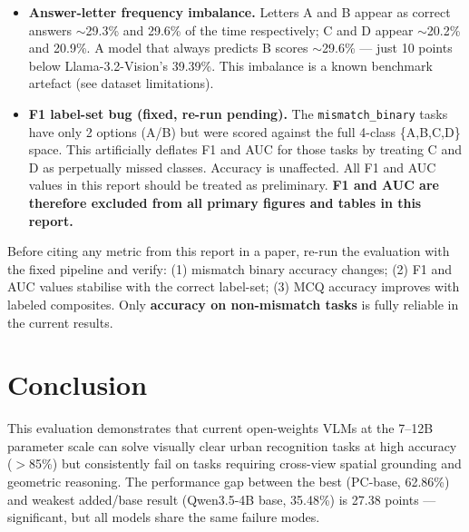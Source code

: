 \documentclass[11pt,a4paper]{article}
\begin{document}
\begin{itemize}[itemsep=4pt]

  \item \textbf{Answer-letter frequency imbalance.}
        Letters A and B appear as correct answers $\sim$29.3\% and
        29.6\% of the time respectively; C and D appear $\sim$20.2\%
        and 20.9\%. A model that always predicts B scores $\sim$29.6\%
        — just 10 points below Llama-3.2-Vision's 39.39\%. This
        imbalance is a known benchmark artefact (see dataset
        limitations).

  \item \textbf{F1 label-set bug (fixed, re-run pending).}
        The \texttt{mismatch\_binary} tasks have only 2 options (A/B)
        but were scored against the full 4-class \{A,B,C,D\} space.
        This artificially deflates F1 and AUC for those tasks by
        treating C and D as perpetually missed classes. Accuracy is
        unaffected. All F1 and AUC values in this report should be
        treated as preliminary. \textbf{F1 and AUC are therefore
        excluded from all primary figures and tables in this report.}

\end{itemize}

\begin{warnbox}
Before citing any metric from this report in a paper, re-run the
evaluation with the fixed pipeline and verify:
(1) mismatch binary accuracy changes;
(2) F1 and AUC values stabilise with the correct label-set;
(3) MCQ accuracy improves with labeled composites.
Only \textbf{accuracy on non-mismatch tasks} is fully reliable in the
current results.
\end{warnbox}

\section{Conclusion}

This evaluation demonstrates that current open-weights VLMs at the 7--12B
parameter scale can solve visually clear urban recognition tasks at high
accuracy ($>$85\%) but consistently fail on tasks requiring cross-view
spatial grounding and geometric reasoning. The performance gap between the
best (PC-base, 62.86\%) and weakest added/base result (Qwen3.5-4B base, 35.48\%)
is 27.38 points — significant, but all models share the same failure modes.
\end{document}
